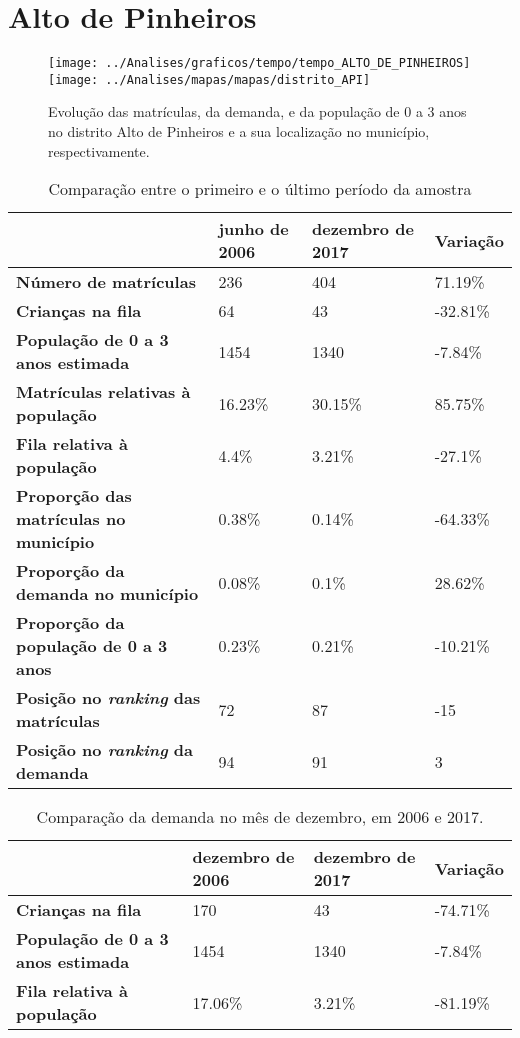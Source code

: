 \section{Alto de Pinheiros}
\begin{figure}[H]
	\centering
	\texttt{[image: ../Analises/graficos/tempo/tempo\_ALTO\_DE\_PINHEIROS]}
	\texttt{[image: ../Analises/mapas/mapas/distrito\_API]}
	\caption{Evolução das matrículas, da demanda, e da população de 0 a 3 anos no distrito Alto de Pinheiros e a sua localização no município, respectivamente.}
\end{figure}
\begin{table}[H]
	\begin{tabular}{|l|l|l|l|}
		\hline
		\textbf{}                                      & \textbf{junho de 2006}       & \textbf{dezembro de 2017}    & \textbf{Variação} \\ \hline
		\textbf{Número de matrículas}                  & 236 & 404 & 71.19\% \\ \hline
		\textbf{Crianças na fila}                      & 64 & 43 & -32.81\% \\ \hline
		\textbf{População de 0 a 3 anos estimada}      & 1454 & 1340 & -7.84\% \\ \hline
		\textbf{Matrículas relativas à população}      & 16.23\% & 30.15\% & 85.75\% \\ \hline
		\textbf{Fila relativa à população}             & 4.4\% & 3.21\% & -27.1\% \\ \hline
		\textbf{Proporção das matrículas no município} & 0.38\% & 0.14\% & -64.33\% \\ \hline
		\textbf{Proporção da demanda no município}     & 0.08\% & 0.1\% & 28.62\% \\ \hline
		\textbf{Proporção da população de 0 a 3 anos}  & 0.23\% & 0.21\% & -10.21\% \\ \hline
		\textbf{Posição no \textit{ranking} das matrículas}     & 72 & 87 & -15 \\ \hline
		\textbf{Posição no \textit{ranking} da demanda}         & 94 & 91 & 3 \\ \hline
	\end{tabular}
	\caption{Comparação entre o primeiro e o último período da amostra}
\end{table}
\begin{table}[H]
	\begin{tabular}{|l|l|l|l|}
		\hline
		\textbf{}                                 & \textbf{dezembro de 2006} & \textbf{dezembro de 2017} & \textbf{Variação} \\ \hline
		\textbf{Crianças na fila}                      & 170 & 43 & -74.71\% \\ \hline
		\textbf{População de 0 a 3 anos estimada}      & 1454 & 1340 & -7.84\% \\ \hline
		\textbf{Fila relativa à população}             & 17.06\% & 3.21\% & -81.19\% \\ \hline
	\end{tabular}
	\caption{Comparação da demanda no mês de dezembro, em 2006 e 2017.}
\end{table}
